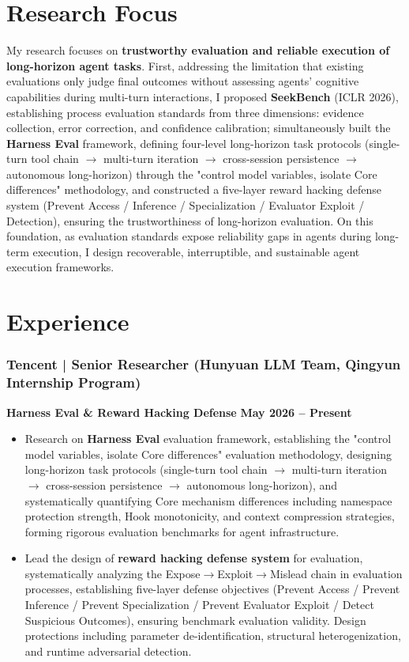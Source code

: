 \documentclass[10pt,a4paper]{article}
\begin{document}
\section*{\color{sectioncolor}Research Focus}
\noindent My research focuses on \textbf{trustworthy evaluation and reliable execution of long-horizon agent tasks}. First, addressing the limitation that existing evaluations only judge final outcomes without assessing agents' cognitive capabilities during multi-turn interactions, I proposed \textbf{SeekBench} (ICLR 2026), establishing process evaluation standards from three dimensions: evidence collection, error correction, and confidence calibration; simultaneously built the \textbf{Harness Eval} framework, defining four-level long-horizon task protocols (single-turn tool chain $\rightarrow$ multi-turn iteration $\rightarrow$ cross-session persistence $\rightarrow$ autonomous long-horizon) through the "control model variables, isolate Core differences" methodology, and constructed a five-layer reward hacking defense system (Prevent Access / Inference / Specialization / Evaluator Exploit / Detection), ensuring the trustworthiness of long-horizon evaluation. On this foundation, as evaluation standards expose reliability gaps in agents during long-term execution, I design recoverable, interruptible, and sustainable agent execution frameworks.
\vspace{0.35em}

\section*{\color{sectioncolor}Experience}
\subsubsection*{\color{itemcolor}Tencent | Senior Researcher (Hunyuan LLM Team, Qingyun Internship Program)}
\noindent\textbf{\color{sectioncolor}Harness Eval \& Reward Hacking Defense} \hfill \color{accentcolor}\textbf{May 2026 -- Present}
\begin{itemize}[leftmargin=*]
    \item Research on \textbf{Harness Eval} evaluation framework, establishing the "control model variables, isolate Core differences" evaluation methodology, designing long-horizon task protocols (single-turn tool chain $\rightarrow$ multi-turn iteration $\rightarrow$ cross-session persistence $\rightarrow$ autonomous long-horizon), and systematically quantifying Core mechanism differences including namespace protection strength, Hook monotonicity, and context compression strategies, forming rigorous evaluation benchmarks for agent infrastructure.
    \item Lead the design of \textbf{reward hacking defense system} for evaluation, systematically analyzing the Expose$\rightarrow$Exploit$\rightarrow$Mislead chain in evaluation processes, establishing five-layer defense objectives (Prevent Access / Prevent Inference / Prevent Specialization / Prevent Evaluator Exploit / Detect Suspicious Outcomes), ensuring benchmark evaluation validity. Design protections including parameter de-identification, structural heterogenization, and runtime adversarial detection.
\end{itemize}
\end{document}
